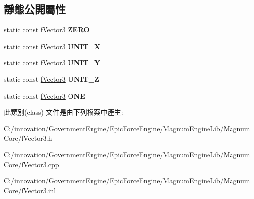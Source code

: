 \subsection*{靜態公開屬性}
\begin{DoxyCompactItemize}
\item 
static const \hyperlink{class_i_dream_sky_1_1f_vector3}{f\+Vector3} {\bfseries Z\+E\+RO}\hypertarget{class_i_dream_sky_1_1f_vector3_a8b635221ddcc314c74ff04d77b83f952}{}\label{class_i_dream_sky_1_1f_vector3_a8b635221ddcc314c74ff04d77b83f952}

\item 
static const \hyperlink{class_i_dream_sky_1_1f_vector3}{f\+Vector3} {\bfseries U\+N\+I\+T\+\_\+X}\hypertarget{class_i_dream_sky_1_1f_vector3_a1671c8cf68d5bc3ca86fafc9559a2084}{}\label{class_i_dream_sky_1_1f_vector3_a1671c8cf68d5bc3ca86fafc9559a2084}

\item 
static const \hyperlink{class_i_dream_sky_1_1f_vector3}{f\+Vector3} {\bfseries U\+N\+I\+T\+\_\+Y}\hypertarget{class_i_dream_sky_1_1f_vector3_ac121aabf4f3109321ffbe360c711a017}{}\label{class_i_dream_sky_1_1f_vector3_ac121aabf4f3109321ffbe360c711a017}

\item 
static const \hyperlink{class_i_dream_sky_1_1f_vector3}{f\+Vector3} {\bfseries U\+N\+I\+T\+\_\+Z}\hypertarget{class_i_dream_sky_1_1f_vector3_ad7ab41ed27baae1b69767066a55fe834}{}\label{class_i_dream_sky_1_1f_vector3_ad7ab41ed27baae1b69767066a55fe834}

\item 
static const \hyperlink{class_i_dream_sky_1_1f_vector3}{f\+Vector3} {\bfseries O\+NE}\hypertarget{class_i_dream_sky_1_1f_vector3_a4318f2d76590f287620fc067e482ee1d}{}\label{class_i_dream_sky_1_1f_vector3_a4318f2d76590f287620fc067e482ee1d}

\end{DoxyCompactItemize}


此類別(class) 文件是由下列檔案中產生\+:\begin{DoxyCompactItemize}
\item 
C\+:/innovation/\+Government\+Engine/\+Epic\+Force\+Engine/\+Magnum\+Engine\+Lib/\+Magnum\+Core/f\+Vector3.\+h\item 
C\+:/innovation/\+Government\+Engine/\+Epic\+Force\+Engine/\+Magnum\+Engine\+Lib/\+Magnum\+Core/f\+Vector3.\+cpp\item 
C\+:/innovation/\+Government\+Engine/\+Epic\+Force\+Engine/\+Magnum\+Engine\+Lib/\+Magnum\+Core/f\+Vector3.\+inl\end{DoxyCompactItemize}

